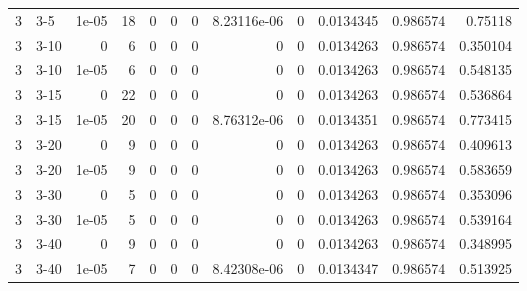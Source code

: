 \begin{tabular}{rlrrrrrrrrrr}
     3 & 3-5    &      1e-05 &          18 &                 0 &                 0 &     0           &     8.23116e-06 &      0           &        0.0134345 &               0.986574 &           0.75118  \\
     3 & 3-10   &      0     &           6 &                 0 &                 0 &     0           &     0           &      0           &        0.0134263 &               0.986574 &           0.350104 \\
     3 & 3-10   &      1e-05 &           6 &                 0 &                 0 &     0           &     0           &      0           &        0.0134263 &               0.986574 &           0.548135 \\
     3 & 3-15   &      0     &          22 &                 0 &                 0 &     0           &     0           &      0           &        0.0134263 &               0.986574 &           0.536864 \\
     3 & 3-15   &      1e-05 &          20 &                 0 &                 0 &     0           &     8.76312e-06 &      0           &        0.0134351 &               0.986574 &           0.773415 \\
     3 & 3-20   &      0     &           9 &                 0 &                 0 &     0           &     0           &      0           &        0.0134263 &               0.986574 &           0.409613 \\
     3 & 3-20   &      1e-05 &           9 &                 0 &                 0 &     0           &     0           &      0           &        0.0134263 &               0.986574 &           0.583659 \\
     3 & 3-30   &      0     &           5 &                 0 &                 0 &     0           &     0           &      0           &        0.0134263 &               0.986574 &           0.353096 \\
     3 & 3-30   &      1e-05 &           5 &                 0 &                 0 &     0           &     0           &      0           &        0.0134263 &               0.986574 &           0.539164 \\
     3 & 3-40   &      0     &           9 &                 0 &                 0 &     0           &     0           &      0           &        0.0134263 &               0.986574 &           0.348995 \\
     3 & 3-40   &      1e-05 &           7 &                 0 &                 0 &     0           &     8.42308e-06 &      0           &        0.0134347 &               0.986574 &           0.513925 \\

\end{tabular}
